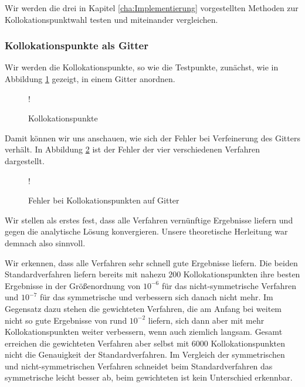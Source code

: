 Wir werden die drei in Kapitel \ref{cha:Implementierung} vorgestellten Methoden zur Kollokationspunktwahl testen und miteinander vergleichen. 
\subsubsection{Kollokationspunkte als Gitter}
Wir werden die Kollokationspunkte, so wie die Testpunkte, zunächst, wie in Abbildung \ref{fig:Kollok} gezeigt, in einem Gitter anordnen.
\begin{figure}[ht]
\centering
\resizebox {\columnwidth} {!} {

}
\caption{Kollokationspunkte}
\label{fig:Kollok}
\end{figure}

Damit können wir uns anschauen, wie sich der Fehler bei Verfeinerung des Gitters verhält. In Abbildung \ref{fig:error} ist der Fehler der vier verschiedenen Verfahren dargestellt. 
\begin{figure}[ht]
\centering
\resizebox {\columnwidth} {!} {

}
\caption{Fehler bei Kollokationspunkten auf Gitter}
\label{fig:error}
\end{figure}

Wir stellen als erstes fest, dass alle Verfahren vernünftige Ergebnisse liefern und gegen die analytische Lösung konvergieren. Unsere theoretische Herleitung war demnach also sinnvoll. 

Wir erkennen, dass alle Verfahren sehr schnell gute Ergebnisse liefern. Die beiden Standardverfahren liefern bereits mit nahezu $200$ Kollokationspunkten ihre besten Ergebnisse in der Größenordnung von $10^{-6}$ für das nicht-symmetrische Verfahren und $10^{-7}$ für das symmetrische und verbessern sich danach nicht mehr. Im Gegensatz dazu stehen die gewichteten Verfahren, die am Anfang bei weitem nicht so gute Ergebnisse von rund $10^{-2}$ liefern, sich dann aber mit mehr Kollokationspunkten weiter verbessern, wenn auch ziemlich langsam. Gesamt erreichen die gewichteten Verfahren aber selbst mit $6000$ Kollokationspunkten nicht die Genauigkeit der Standardverfahren. Im Vergleich der symmetrischen und nicht-symmetrischen Verfahren schneidet beim Standardverfahren das symmetrische leicht besser ab, beim gewichteten ist kein Unterschied erkennbar.

